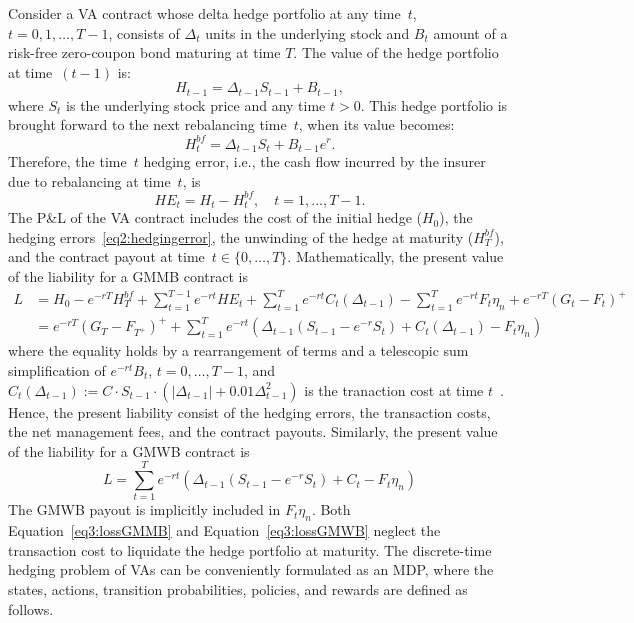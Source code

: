 Consider a VA contract whose delta hedge portfolio at any time~$t$, $t=0,1,\ldots,T-1$, consists of $\Delta_t$ units in the underlying stock and $B_t$ amount of a risk-free zero-coupon bond maturing at time $T$.
The value of the hedge portfolio at time~$(t-1)$ is:
\begin{equation*}
    H_{t-1} = \Delta_{t-1} S_{t-1} + B_{t-1},
\end{equation*}
where $S_t$ is the underlying stock price and any time $t>0$.
This hedge portfolio is brought forward to the next rebalancing time~$t$, when its value becomes:
\begin{equation*}
    H_{t}^{bf} = \Delta_{t-1} S_{t} + B_{t-1}e^{r}.
\end{equation*}
Therefore, the time~$t$ hedging error, i.e., the cash flow incurred by the insurer due to rebalancing at time~$t$, is
\begin{equation}
    HE_t = H_t - H^{bf}_t, \quad t=1,\ldots, T-1.
\end{equation}
The P\&L of the VA contract includes the cost of the initial hedge ($H_0$), the hedging errors~\eqref{eq2:hedgingerror}, the unwinding of the hedge at maturity ($H^{bf}_T$), and the contract payout at time~$t\in \{0,\ldots,T\}$.
Mathematically, the present value of the liability for a GMMB contract is 
\begin{align} \label{eq3:lossGMMB}
L   & = H_0 - e^{-rT} H^{bf}_T + \sum_{t=1}^{T-1} e^{-rt} HE_t + \sum_{t=1}^T e^{-rt} C_t(\Delta_{t-1}) - \sum_{t=1}^T e^{-rt} F_t\eta_n + e^{-rT} (G_t - F_t)^+  \nonumber \\ 
    & = e^{-rT} (G_T - F_{T^+})^+ + \sum_{t=1}^T e^{-rt}  \left( \Delta_{t-1} (S_{t-1} - e^{-r} S_t) + C_t(\Delta_{t-1}) - F_t\eta_n \right) 
\end{align}
where the equality holds by a rearrangement of terms and a telescopic sum simplification of $e^{-rt}B_t$, $t=0,\ldots,T-1$, and $C_t(\Delta_{t-1}) := C \cdot S_{t-1} \cdot (|\Delta_{t-1}| + 0.01 \Delta_{t-1}^2)$ is the tranaction cost at time $t$~\cite{garleanu2013dynamic}.
Hence, the present liability consist of the hedging errors, the transaction costs, the net management fees, and the contract payouts.
Similarly, the present value of the liability for a GMWB contract is
\begin{equation} \label{eq3:lossGMWB}
L = \sum_{t=1}^T e^{-rt}  \left( \Delta_{t-1} (S_{t-1} - e^{-r} S_t) + C_t - F_t\eta_n \right)
\end{equation}
The GMWB payout is implicitly included in $F_t\eta_n$.
Both Equation~\ref{eq3:lossGMMB} and Equation~\ref{eq3:lossGMWB} neglect the transaction cost to liquidate the hedge portfolio at maturity.
The discrete-time hedging problem of VAs can be conveniently formulated as an MDP, where the states, actions, transition probabilities, policies, and rewards are defined as follows.

